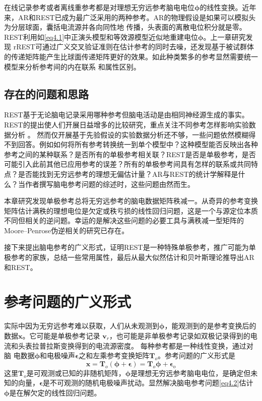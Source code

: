 在线记录参考或者离线重参考都是对理想无穷远参考脑电电位$\mathbf{\phi}$的线性变换。近年来，AR和REST已成为最广泛采用的两种参考。AR的物理假设是如果可以模拟头为分层球面，囊括电流源并各向同性地
传播，头表面的离散电位积分就是零。 REST利用如\eqref{eq4.1}中正演头模型和等效源模型近似地重建电位$\mathbf{\phi}$。上一章研究发现
rREST可通过广义交叉验证准则在估计参考的同时去噪，还发现基于被试群体的传递矩阵能产生比球面传递矩阵更好的效果。如此种类繁多的参考显然需要统一模型来分析参考间的内在联系
和属性区别。

\subsection{存在的问题和思路}
REST基于无论脑电记录采用哪种参考但脑电活动是由相同神经源生成的事实。REST的提出使人们开展日益增多的比较研究，重点关注不同参考怎样影响实验数据分析 。 然而仅开展基于先验假设的实验数据分析还不够，一些问题依然模糊得不到回答。例如如何将所有参考转换统一到单个模型中？这种模型能否反映出各种参考之间的某种联系？是否所有的单极参考相关联？REST是否是单极参考，是否可能引入此前其他已应用参考的误差？所有的单极参考间具有怎样的联系或共同特点？是否能找到无穷远参考的理想无偏估计量？AR与REST的统计学解释是什么？当作者撰写脑电参考问题的综述时，这些问题由然而生。

本章研究发现单极参考总将无穷远参考的脑电数据矩阵秩减一。从奇异的参考变换矩阵估计满秩的理想电位是欠定或秩亏损的线性回归问题，这是一个与源定位本质不同但相关的逆问题。幸运的是解决这些问题的必要工具与满秩减一型矩阵的Moore–Penrose伪逆相关的研究已存在。

接下来提出脑电参考的广义形式，证明REST是一种特殊单极参考，推广可能为单极参考的家族，总结一些常用属性，最后从最大似然估计和贝叶斯理论推导出AR和REST。

\section{参考问题的广义形式}
实际中因为无穷远参考难以获取，人们从未观测到$\mathbf{\phi}$，能观测到的是参考变换后的数据$\mathbf{x}$。它可能是单极参考记录
$\mathbf{v}_r$，也可能是非单极参考记录如双极记录得到的电流和头表拉普拉斯变换得到的电流源密度。 每种参考都是一种线性变换，通过对脑
电数据$\mathbf{\phi}$和电极噪声$\mathbf{\epsilon}$之和左乘参考变换矩阵$\mathbf{T}_o$。参考问题的广义形式是
\begin{equation}\label{eq4.2}
\mathbf{x}=\mathbf{T}_{o}(\mathbf{\phi+\epsilon})=\mathbf{T}_{o}\mathbf{\phi}+\mathbf{\epsilon}_o
\end{equation}
这里$\mathbf{T}_o$是可观测或已知的非随机矩阵，$\mathbf{\phi}$是理想无穷远参考脑电电位，是确定但未知的向量，$\mathbf{\epsilon}$是不可观测的随机电极噪声扰动。显然解决脑电参考问题\eqref{eq4.2}估计$\mathbf{\phi}$是在解欠定的线性回归问题。 

